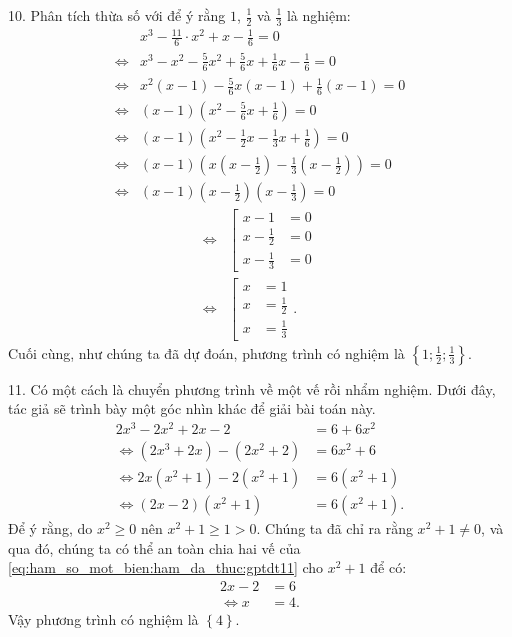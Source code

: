 10. Phân tích thừa số với để ý rằng $1$, $\frac{1}{2}$ và $\frac{1}{3}$ là nghiệm:
\begin{align*}
   &x^3 - \frac{11}{6}\cdot x^2 + x - \frac{1}{6} = 0 \\
   \iff &x^3 - x^2 - \frac{5}{6}x^2 + \frac{5}{6}x + \frac{1}{6}x - \frac{1}{6} = 0 \\
   \iff &x^2\left(x - 1\right) - \frac{5}{6}x\left(x - 1\right) + \frac{1}{6}\left(x - 1\right) = 0 \\
   \iff &\left(x - 1\right)\left(x^2 - \frac{5}{6}x + \frac{1}{6}\right) = 0 \\
   \iff &\left(x - 1\right)\left(x^2 - \frac{1}{2}x - \frac{1}{3}x + \frac{1}{6}\right) = 0 \\
   \iff &\left(x - 1\right)\left(x\left(x - \frac{1}{2}\right) - \frac{1}{3}\left(x - \frac{1}{2}\right)\right) = 0 \\
   \iff &\left(x - 1\right)\left(x - \frac{1}{2}\right)\left(x - \frac{1}{3}\right) = 0
\end{align*}
\begin{align*}
   \iff &\left[
      \begin{aligned}
         x - 1 &= 0 \\
         x - \frac{1}{2} &= 0 \\
         x - \frac{1}{3} &= 0
      \end{aligned}
   \right. \\
   \iff &\left[
      \begin{aligned}
         x &= 1 \\
         x &= \frac{1}{2} \\
         x &= \frac{1}{3}
      \end{aligned}
   \right..
\end{align*}
Cuối cùng, như chúng ta đã dự đoán, phương trình có nghiệm là $\displaystyle\left\{1; \frac{1}{2}; \frac{1}{3}\right\}$.

11. Có một cách là chuyển phương trình về một vế rồi nhẩm nghiệm. Dưới đây, tác giả sẽ trình bày một góc nhìn khác để giải bài toán này.
\begin{align}
   2x^3 - 2x^2 + 2x - 2 &= 6 + 6x^2 \nonumber\\
   \iff \left(2x^3 + 2x\right) - \left(2x^2 + 2\right) &= 6x^2 + 6 \nonumber\\
   \iff 2x\left(x^2 + 1\right) - 2\left(x^2 + 1\right) &= 6\left(x^2 + 1\right) \nonumber\\
   \iff \left(2x - 2\right)\left(x^2 + 1\right) &= 6\left(x^2 + 1\right). \label{eq:ham_so_mot_bien:ham_da_thuc:gptdt11}
\end{align}
Để ý rằng, do $x^2 \geq 0$ nên $x^2 + 1 \geq 1 > 0$. Chúng ta đã chỉ ra rằng $x^2 + 1 \neq 0$, và qua đó, chúng ta có thể an toàn chia hai vế của \ref{eq:ham_so_mot_bien:ham_da_thuc:gptdt11} cho $x^2 + 1$ để có:
\begin{align*}
   2x - 2 &= 6 \\
   \iff x &= 4.
\end{align*}
Vậy phương trình có nghiệm là $\displaystyle\left\{4\right\}$.

